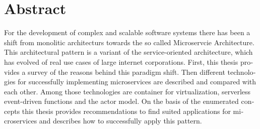\chapter{Abstract}

\begin{english} %

For the development of complex and scalable software systems there has been a shift from monolitic architecturs towards the so called Microservcie Architecture. This architectural pattern is a variant of the service-oriented architecture, which has evolved of real use cases of large internet corporations. First, this thesis provides a survey of the reasons behind this paradigm shift. Then different technologies for successfully implementing microservices are described and compared with each other. Among those technologies are container for virtualization, serverless event-driven functions and the actor model. On the basis of the enumerated concepts this thesis provides recommendations to find suited applications for microservices and describes how to successfully apply this pattern.

\end{english}
